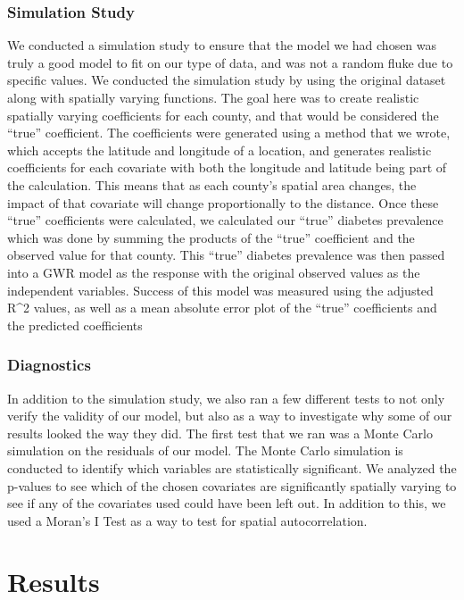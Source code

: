 \documentclass[
]{article}
\begin{document}
\subsubsection{Simulation Study}\label{simulation-study}

We conducted a simulation study to ensure that the model we had chosen
was truly a good model to fit on our type of data, and was not a random
fluke due to specific values. We conducted the simulation study by using
the original dataset along with spatially varying functions. The goal
here was to create realistic spatially varying coefficients for each
county, and that would be considered the ``true'' coefficient. The
coefficients were generated using a method that we wrote, which accepts
the latitude and longitude of a location, and generates realistic
coefficients for each covariate with both the longitude and latitude
being part of the calculation. This means that as each county's spatial
area changes, the impact of that covariate will change proportionally to
the distance. Once these ``true'' coefficients were calculated, we
calculated our ``true'' diabetes prevalence which was done by summing
the products of the ``true'' coefficient and the observed value for that
county. This ``true'' diabetes prevalence was then passed into a GWR
model as the response with the original observed values as the
independent variables. Success of this model was measured using the
adjusted R\^{}2 values, as well as a mean absolute error plot of the
``true'' coefficients and the predicted coefficients

\subsubsection{Diagnostics}\label{diagnostics}

In addition to the simulation study, we also ran a few different tests
to not only verify the validity of our model, but also as a way to
investigate why some of our results looked the way they did. The first
test that we ran was a Monte Carlo simulation on the residuals of our
model. The Monte Carlo simulation is conducted to identify which
variables are statistically significant. We analyzed the p-values to see
which of the chosen covariates are significantly spatially varying to
see if any of the covariates used could have been left out. In addition
to this, we used a Moran's I Test as a way to test for spatial
autocorrelation.

\section{Results}\label{results}
\end{document}
